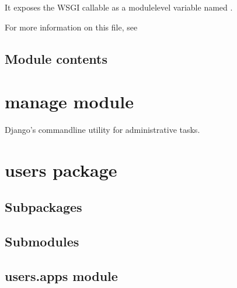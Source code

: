 \documentclass[letterpaper,10pt,english]{sphinxmanual}
\begin{document}
\sphinxAtStartPar
It exposes the WSGI callable as a module\sphinxhyphen{}level variable named .

\sphinxAtStartPar
For more information on this file, see


\subsection{Module contents}
\label{\detokenize{demo:module-demo}}\label{\detokenize{demo:module-contents}}

\section{manage module}
\label{\detokenize{manage:module-manage}}\label{\detokenize{manage:manage-module}}\label{\detokenize{manage::doc}}
\sphinxAtStartPar
Django’s command\sphinxhyphen{}line utility for administrative tasks.

\begin{fulllineitems}
\label{\detokenize{manage:manage.main}}
\end{fulllineitems}



\section{users package}
\label{\detokenize{users:users-package}}\label{\detokenize{users::doc}}

\subsection{Subpackages}
\label{\detokenize{users:subpackages}}

\subsection{Submodules}
\label{\detokenize{users:submodules}}

\subsection{users.apps module}
\label{\detokenize{users:module-users.apps}}\label{\detokenize{users:users-apps-module}}
\end{document}

